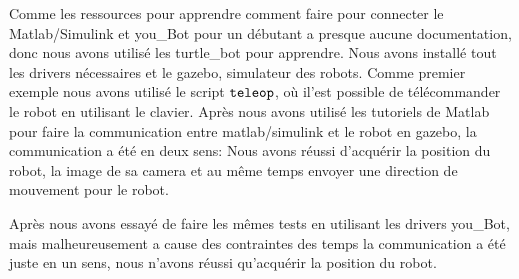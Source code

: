 \label{resultats/commum}

	Comme les ressources pour apprendre comment faire pour connecter le Matlab/Simulink et you\_Bot pour un débutant a presque aucune documentation, donc nous avons utilisé les turtle\_bot pour apprendre.
	Nous avons installé tout les drivers nécessaires et le gazebo, simulateur des robots. Comme premier exemple nous avons utilisé le script $ \verb|teleop|$, où il'est possible de télécommander le robot en utilisant le clavier.
	Après nous avons utilisé les tutoriels de Matlab pour faire la communication entre matlab/simulink et le robot en gazebo, la communication a été en deux sens: Nous avons réussi d'acquérir la position du robot, la image de sa camera et au même temps envoyer une direction de mouvement pour le robot.    
	

	Après nous avons essayé de faire les mêmes tests en utilisant les drivers you\_Bot, mais malheureusement a cause des contraintes des temps la communication a été juste en un sens, nous n'avons réussi qu'acquérir la position du robot.
\pagebreak